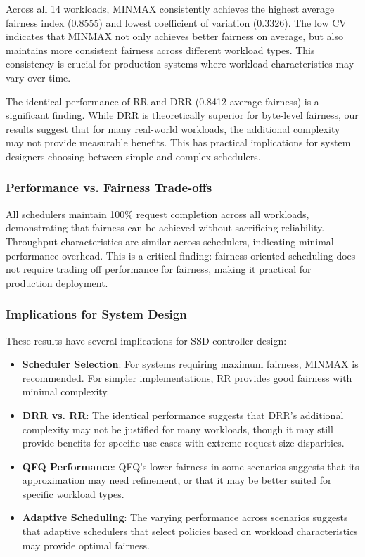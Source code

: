 \documentclass[11pt]{article}
\begin{document}
Across all 14 workloads, MINMAX consistently achieves the highest average fairness index (0.8555) and lowest coefficient of variation (0.3326). The low CV indicates that MINMAX not only achieves better fairness on average, but also maintains more consistent fairness across different workload types. This consistency is crucial for production systems where workload characteristics may vary over time.

The identical performance of RR and DRR (0.8412 average fairness) is a significant finding. While DRR is theoretically superior for byte-level fairness, our results suggest that for many real-world workloads, the additional complexity may not provide measurable benefits. This has practical implications for system designers choosing between simple and complex schedulers.

\subsubsection{Performance vs. Fairness Trade-offs}

All schedulers maintain 100\% request completion across all workloads, demonstrating that fairness can be achieved without sacrificing reliability. Throughput characteristics are similar across schedulers, indicating minimal performance overhead. This is a critical finding: fairness-oriented scheduling does not require trading off performance for fairness, making it practical for production deployment.

\subsubsection{Implications for System Design}

These results have several implications for SSD controller design:
\begin{itemize}
    \item \textbf{Scheduler Selection}: For systems requiring maximum fairness, MINMAX is recommended. For simpler implementations, RR provides good fairness with minimal complexity.
    \item \textbf{DRR vs. RR}: The identical performance suggests that DRR's additional complexity may not be justified for many workloads, though it may still provide benefits for specific use cases with extreme request size disparities.
    \item \textbf{QFQ Performance}: QFQ's lower fairness in some scenarios suggests that its approximation may need refinement, or that it may be better suited for specific workload types.
    \item \textbf{Adaptive Scheduling}: The varying performance across scenarios suggests that adaptive schedulers that select policies based on workload characteristics may provide optimal fairness.
\end{itemize}
\end{document}
